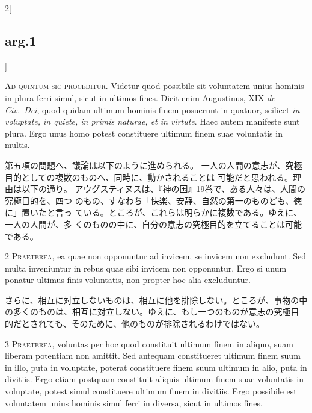 \documentclass[paper=a4paper,fontsize=10pt,jafontsize=9pt,titlepage]{jlreq}
\begin{document}
\begin{paracol}{2}[\subsection{arg.1}]

{\Huge A}{\scshape d quintum sic proceditur}. Videtur quod
possibile sit voluntatem unius hominis in plura ferri simul, sicut in
ultimos fines. Dicit enim Augustinus, XIX {\itshape de Civ.~Dei}, quod quidam
ultimum hominis finem posuerunt in quatuor, scilicet {\itshape in voluptate, in
quiete, in primis naturae, et in virtute}. Haec autem manifeste sunt
plura. Ergo unus homo potest constituere ultimum finem suae voluntatis
in multis.

\switchcolumn

第五項の問題へ、議論は以下のように進められる。
一人の人間の意志が、究極目的としての複数のものへ、同時に、動かされることは
 可能だと思われる。理由は以下の通り。
アウグスティヌスは、『神の国』19巻で、ある人々は、人間の究極目的を、四つ
 のもの、すなわち「快楽、安静、自然の第一のものども、徳に」置いたと言っ
 ている。ところが、これらは明らかに複数である。ゆえに、一人の人間が、多
 くのものの中に、自分の意志の究極目的を立てることは可能である。


{\scshape 2 Praeterea}, ea quae non opponuntur ad
invicem, se invicem non excludunt. Sed multa inveniuntur in rebus quae
sibi invicem non opponuntur. Ergo si unum ponatur ultimus finis
voluntatis, non propter hoc alia excluduntur.

\switchcolumn

さらに、相互に対立しないものは、相互に他を排除しない。ところが、事物の中
 の多くのものは、相互に対立しない。ゆえに、もし一つのものが意志の究極目
 的だとされても、そのために、他のものが排除されるわけではない。


{\scshape 3 Praeterea}, voluntas per hoc quod
constituit ultimum finem in aliquo, suam liberam potentiam non
amittit. Sed antequam constitueret ultimum finem suum in illo, puta in
voluptate, poterat constituere finem suum ultimum in alio, puta in
divitiis. Ergo etiam postquam constituit aliquis ultimum finem suae
voluntatis in voluptate, potest simul constituere ultimum finem in
divitiis. Ergo possibile est voluntatem unius hominis simul ferri in
diversa, sicut in ultimos fines.


\end{paracol}
\end{document}
